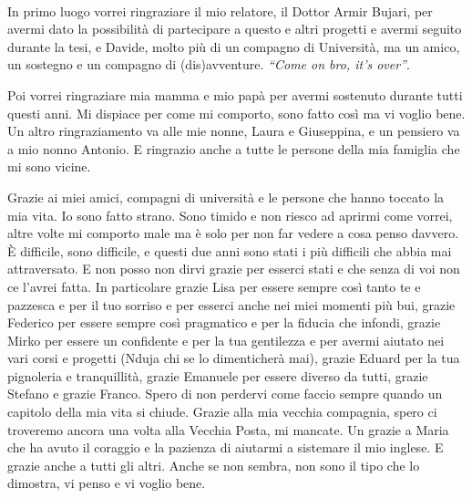 \cleardoublepage
{}
\thispagestyle{empty}


\begingroup
\let\clearpage\relax
\let\cleardoublepage\relax
\let\cleardoublepage\relax


\\

\noindent
In primo luogo vorrei ringraziare il mio relatore, il Dottor Armir Bujari,
per avermi dato la possibilità di partecipare a questo e altri progetti e
avermi seguito durante la tesi, e Davide, molto più di un compagno di
Università, ma un amico, un sostegno e un compagno di (dis)avventure.
\emph{``Come on bro, it's over''}.

\vspace*{0.4cm}

\noindent
Poi vorrei ringraziare mia mamma e mio papà per avermi sostenuto durante tutti
questi anni. Mi dispiace per come mi comporto, sono fatto così ma vi voglio
bene. Un altro ringraziamento va alle mie nonne, Laura e Giuseppina, e un
pensiero va a mio nonno Antonio. E ringrazio anche a tutte le persone della mia
famiglia che mi sono vicine.

\vspace*{0.4cm}

\noindent
Grazie ai miei amici, compagni di università e le persone che hanno
toccato la mia vita. Io sono fatto strano. Sono timido e non riesco ad aprirmi
come vorrei, altre volte mi comporto male ma è solo per non far vedere a cosa
penso davvero. È difficile, sono difficile, e questi due anni sono stati i più
difficili che abbia mai attraversato. E non posso non dirvi grazie per esserci
stati e che senza di voi non ce l'avrei fatta. In particolare grazie Lisa per
essere sempre così tanto te e pazzesca e per il tuo sorriso e per esserci anche
nei miei momenti più bui, grazie Federico per essere sempre così pragmatico e
per la fiducia che infondi, grazie Mirko per essere un confidente e per la tua
gentilezza e per avermi aiutato nei vari corsi e progetti (Nduja chi se lo
dimenticherà mai), grazie Eduard per la tua pignoleria e tranquillità, grazie
Emanuele per essere diverso da tutti, grazie Stefano e grazie Franco. Spero di
non perdervi come faccio sempre quando un capitolo della mia vita si chiude.
Grazie alla mia vecchia compagnia, spero ci troveremo ancora una volta alla
Vecchia Posta, mi mancate. Un grazie a Maria che ha avuto il coraggio e la
pazienza di aiutarmi a sistemare il mio inglese. E grazie anche a tutti gli
altri. Anche se non sembra, non sono il tipo che lo dimostra, vi penso e vi
voglio bene.

